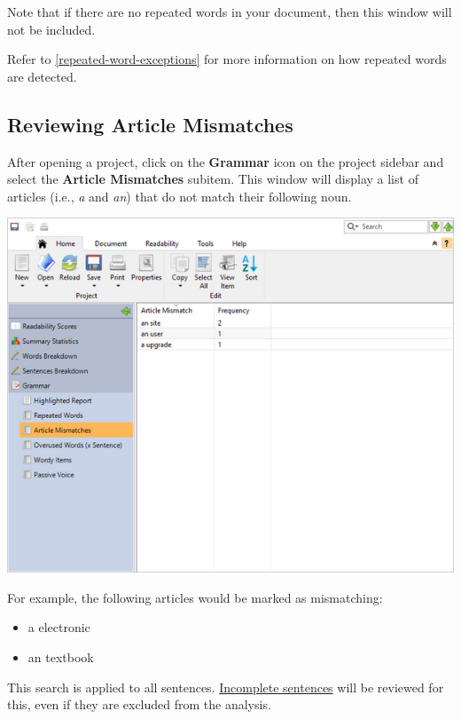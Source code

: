 \documentclass[
]{book}
\providecommand{\tightlist}{%
  \setlength{\itemsep}{0pt}\setlength{\parskip}{0pt}}
\theoremstyle{definition}
\theoremstyle{definition}
\theoremstyle{definition}
\theoremstyle{definition}
\theoremstyle{remark}
\begin{document}
Note that if there are no repeated words in your document, then this window will not be included.

Refer to \ref{repeated-word-exceptions} for more information on how repeated words are detected.

\hypertarget{reviewing-article-mismatches}{%
\subsection*{Reviewing Article Mismatches}\label{reviewing-article-mismatches}}

After opening a project, click on the \textbf{Grammar} icon on the project sidebar and select the \textbf{Article Mismatches} subitem. This window will display a list of articles (i.e., \emph{a} and \emph{an}) that do not match their following noun.

\includegraphics{Images/articlemismatches.png}

For example, the following articles would be marked as mismatching:

\begin{itemize}
\tightlist
\item
  a electronic
\item
  an textbook
\end{itemize}

This search is applied to all sentences. \protect\hyperlink{how-text-is-excluded}{Incomplete sentences} will be reviewed for this, even if they are excluded from the analysis.
\end{document}
